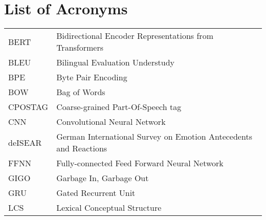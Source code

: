{}
\chapter*{List of Acronyms}

\begin{supertabular}{lp{12.5cm}}
BERT    & Bidirectional Encoder Representations from Transformers\\
BLEU    & Bilingual Evaluation Understudy\\
BPE     & Byte Pair Encoding\\
BOW     & Bag of Words\\
CPOSTAG & Coarse-grained Part-Of-Speech tag\\
CNN     & Convolutional Neural Network\\
deISEAR & German International Survey on Emotion Antecedents and Reactions\\
FFNN    & Fully-connected Feed Forward Neural Network\\
GIGO    & Garbage In, Garbage Out\\
GRU     & Gated Recurrent Unit\\
LCS     & Lexical Conceptual Structure\\

\end{supertabular}

